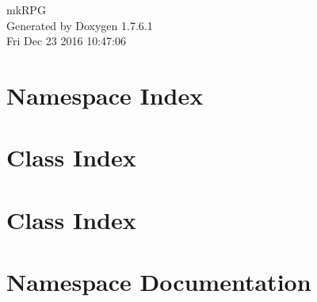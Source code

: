 \documentclass[a4paper]{book}
\begin{document}
\hypersetup{pageanchor=false,citecolor=blue}
\begin{titlepage}
\vspace*{7cm}
\begin{center}
{\Large mk\-R\-P\-G }\\
\vspace*{1cm}
{\large \-Generated by Doxygen 1.7.6.1}\\
\vspace*{0.5cm}
{\small Fri Dec 23 2016 10:47:06}\\
\end{center}
\end{titlepage}
\clearemptydoublepage
{}
\tableofcontents
\clearemptydoublepage
{}
\hypersetup{pageanchor=true,citecolor=blue}
\chapter{\-Namespace \-Index}

\chapter{\-Class \-Index}

\chapter{\-Class \-Index}

\chapter{\-Namespace \-Documentation}


\end{document}
